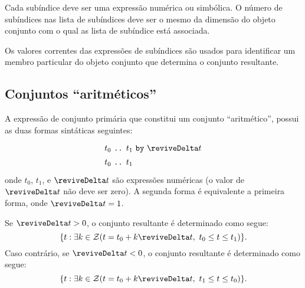 \documentclass[11pt, brazil]{report}
\begin{document}
Cada subíndice deve ser uma expressão numérica ou simbólica. O número de
subíndices nas lista de subíndices deve ser o mesmo da dimensão do objeto
conjunto com o qual as lista de subíndice está associada.

Os valores correntes das expressões de subíndices são usados para identificar
um membro \linebreak particular do objeto conjunto que determina o conjunto resultante.

%

\subsection{Conjuntos ``aritméticos''}

A expressão de conjunto primária que constitui um conjunto ``aritmético'',
possui as duas formas sintáticas seguintes:
$$
{\def\arraystretch{1.4}
\begin{array}{l}
\mbox{$t_0$ {\tt..} $t_1$ {\tt by} $\reviveDelta t$}\\
\mbox{$t_0$ {\tt..} $t_1$}\\
\end{array}
}
$$
onde $t_0$, $t_1$, e $\reviveDelta t$ são expressões numéricas (o valor de
$\reviveDelta t$ não deve ser zero). A segunda forma é equivalente a primeira
forma, onde $\reviveDelta t=1$.

Se $\reviveDelta t>0$, o conjunto resultante é determinado como segue:
$$\{t:\exists k\in{\cal Z}(t=t_0+k\reviveDelta t,\ t_0\leq t\leq t_1)\}.$$
Caso contrário, se $\reviveDelta t<0$, o conjunto resultante é determinado como segue:
$$\{t:\exists k\in{\cal Z}(t=t_0+k\reviveDelta t,\ t_1\leq t\leq t_0)\}.$$
%
\end{document}
